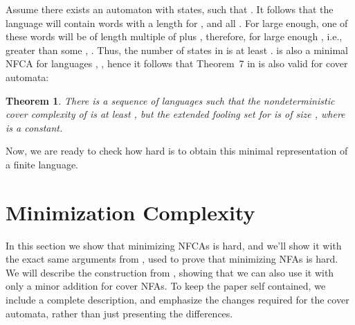 \documentclass[submission,copyright,creativecommons]{eptcs}
\newtheorem{theorem}{Theorem}
\begin{document}
Assume there exists an automaton  with  states,  such that
 .
It follows that the language  will contain words 
with a length  for , and all . For  large enough, one of these words will be 
of length multiple of  plus , therefore, for large enough , i.e., greater than some ,
. Thus, the number of states in  is at least .
 is also a minimal NFCA for languages , , hence it follows that Theorem~7 in 
\cite{GruberHolzerNFAHard} is also valid for cover automata:

\begin{theorem}
 There is a sequence of languages  such that the nondeterministic cover complexity
of  is at least , but the extended fooling set for  is of size ,
 where  is a constant.
\end{theorem}

Now, we are ready to check how hard is to obtain this minimal representation
of a finite language.


\section{Minimization Complexity}
\label{shard}

In this section we show that minimizing NFCAs is hard, and we'll show it with the exact same arguments from \cite{gruberholzerunary},
used to prove that minimizing NFAs is hard.
We will describe the construction from \cite{gramlich,gruberholzerunary}, showing 
that we can also use it with only a minor addition for cover NFAs.
To keep the paper self contained, we include a complete description,  
and emphasize the changes required for the cover automata, rather 
than just presenting the differences. 
\end{document}
